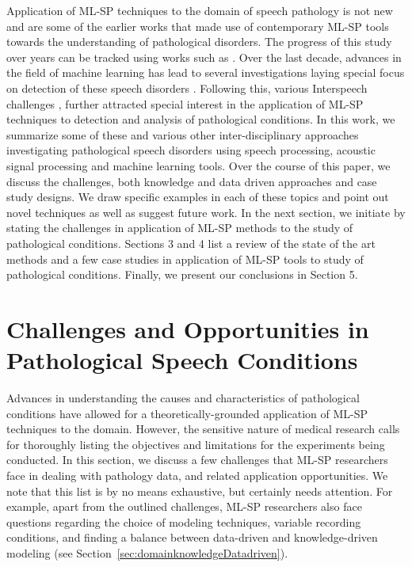 \documentclass{article}
\begin{document}
Application of ML-SP techniques to the domain of speech pathology is not new and \cite{rees1973auditory,davis1979acoustic} are some of the earlier works that made use of contemporary ML-SP tools towards the understanding of pathological disorders. 
The progress of this study over years can be tracked using works such as \cite{abberton1989laryngographic,manfredi2000adaptive}.
Over the last decade, advances in the field of machine learning has lead to several investigations laying special focus on detection of these speech disorders \cite{fonseca2007wavelet,chee2009mfcc}. Following this, various Interspeech challenges \cite{schuller2012interspeech,}, further attracted special interest in the application of ML-SP techniques to detection and analysis of pathological conditions.  
In this work, we summarize some of these and various other inter-disciplinary approaches investigating pathological speech disorders using speech processing, acoustic signal processing and machine learning tools.
Over the course of this paper, we discuss the challenges, both knowledge and data driven approaches and case study designs. 
We draw specific examples in each of these topics and point out novel techniques as well as suggest future work.
In the next section, we initiate by stating the challenges in application of ML-SP methods to the study of pathological conditions.
Sections 3 and 4 list a review of the state of the art methods and a few case studies in application of ML-SP tools to study of pathological conditions.
Finally, we present our conclusions in Section 5. 

\section{Challenges and Opportunities in Pathological Speech Conditions}
Advances in understanding the causes and characteristics of pathological conditions have allowed for a theoretically-grounded application of ML-SP techniques to the domain.
However, the sensitive nature of medical research calls for thoroughly listing the objectives and limitations for the experiments being conducted.
In this section, we discuss a few challenges that ML-SP researchers face in dealing with pathology data, and related application opportunities. We note that this list is by no means exhaustive, but certainly needs attention. For example, apart from the outlined challenges, ML-SP researchers also face questions regarding the choice of modeling techniques, variable recording conditions, and finding a balance between data-driven and knowledge-driven modeling (see Section~\ref{sec:domainknowledgeDatadriven}).
\end{document}

